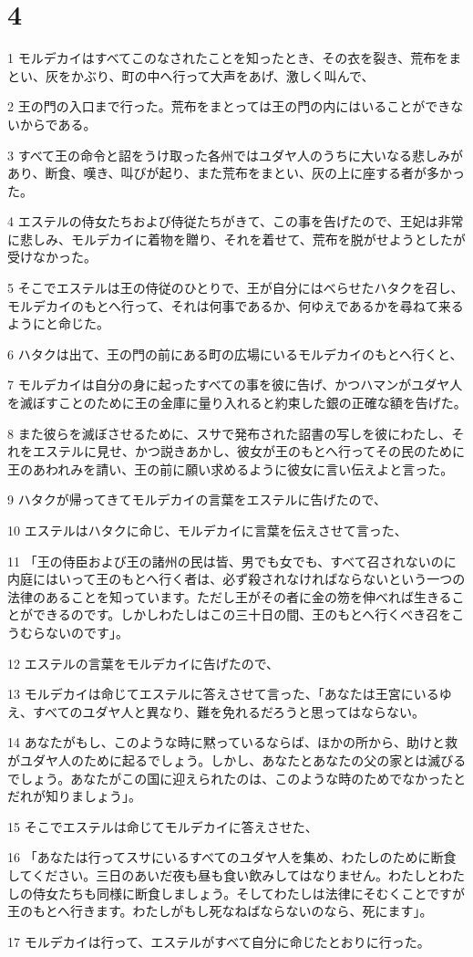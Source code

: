 \chapter{4}

\par 1 モルデカイはすべてこのなされたことを知ったとき、その衣を裂き、荒布をまとい、灰をかぶり、町の中へ行って大声をあげ、激しく叫んで、
\par 2 王の門の入口まで行った。荒布をまとっては王の門の内にはいることができないからである。
\par 3 すべて王の命令と詔をうけ取った各州ではユダヤ人のうちに大いなる悲しみがあり、断食、嘆き、叫びが起り、また荒布をまとい、灰の上に座する者が多かった。
\par 4 エステルの侍女たちおよび侍従たちがきて、この事を告げたので、王妃は非常に悲しみ、モルデカイに着物を贈り、それを着せて、荒布を脱がせようとしたが受けなかった。
\par 5 そこでエステルは王の侍従のひとりで、王が自分にはべらせたハタクを召し、モルデカイのもとへ行って、それは何事であるか、何ゆえであるかを尋ねて来るようにと命じた。
\par 6 ハタクは出て、王の門の前にある町の広場にいるモルデカイのもとへ行くと、
\par 7 モルデカイは自分の身に起ったすべての事を彼に告げ、かつハマンがユダヤ人を滅ぼすことのために王の金庫に量り入れると約束した銀の正確な額を告げた。
\par 8 また彼らを滅ぼさせるために、スサで発布された詔書の写しを彼にわたし、それをエステルに見せ、かつ説きあかし、彼女が王のもとへ行ってその民のために王のあわれみを請い、王の前に願い求めるように彼女に言い伝えよと言った。
\par 9 ハタクが帰ってきてモルデカイの言葉をエステルに告げたので、
\par 10 エステルはハタクに命じ、モルデカイに言葉を伝えさせて言った、
\par 11 「王の侍臣および王の諸州の民は皆、男でも女でも、すべて召されないのに内庭にはいって王のもとへ行く者は、必ず殺されなければならないという一つの法律のあることを知っています。ただし王がその者に金の笏を伸べれば生きることができるのです。しかしわたしはこの三十日の間、王のもとへ行くべき召をこうむらないのです」。
\par 12 エステルの言葉をモルデカイに告げたので、
\par 13 モルデカイは命じてエステルに答えさせて言った、「あなたは王宮にいるゆえ、すべてのユダヤ人と異なり、難を免れるだろうと思ってはならない。
\par 14 あなたがもし、このような時に黙っているならば、ほかの所から、助けと救がユダヤ人のために起るでしょう。しかし、あなたとあなたの父の家とは滅びるでしょう。あなたがこの国に迎えられたのは、このような時のためでなかったとだれが知りましょう」。
\par 15 そこでエステルは命じてモルデカイに答えさせた、
\par 16 「あなたは行ってスサにいるすべてのユダヤ人を集め、わたしのために断食してください。三日のあいだ夜も昼も食い飲みしてはなりません。わたしとわたしの侍女たちも同様に断食しましょう。そしてわたしは法律にそむくことですが王のもとへ行きます。わたしがもし死なねばならないのなら、死にます」。
\par 17 モルデカイは行って、エステルがすべて自分に命じたとおりに行った。

